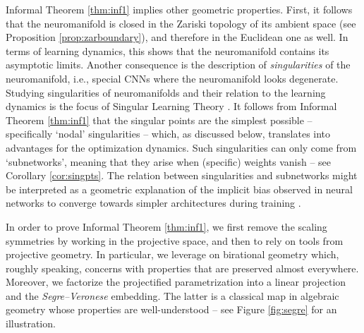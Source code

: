 \documentclass[twoside]{article}
\theoremstyle{plain}%
\theoremstyle{definition}
\theoremstyle{remark}
\begin{document}
Informal Theorem \ref{thm:inf1} implies other geometric properties. First, it follows that the neuromanifold is closed in the Zariski topology of its ambient space (see Proposition \ref{prop:zarboundary}), and therefore in the Euclidean one as well. In terms of learning dynamics, this shows that the neuromanifold contains its asymptotic limits. Another consequence is the description of \emph{singularities} of the neuromanifold, i.e., special CNNs where the neuromanifold looks degenerate. Studying singularities of neuromanifolds and their relation to the learning dynamics is the focus of Singular Learning Theory \parencite{watanabe2009algebraic,amari2006singularities}. It follows from Informal Theorem \ref{thm:inf1} that the singular points are the simplest possible -- specifically `nodal' singularities -- which, as discussed below, translates into advantages for the optimization dynamics. Such singularities can only come from `subnetworks', meaning that they arise when (specific) weights vanish -- see Corollary \ref{cor:singpts}. The relation between singularities and subnetworks might be interpreted as a geometric explanation of the implicit bias observed in neural networks to converge towards simpler architectures during training \parencite{frankle2018lottery}.

In order to prove Informal Theorem \ref{thm:inf1}, we first remove the scaling symmetries by working in the projective space, and then to rely on tools from projective geometry. In particular, we leverage on birational geometry which, roughly speaking, concerns with properties that are preserved almost everywhere. Moreover, we factorize the projectified parametrization into a linear projection and the \emph{Segre--Veronese} embedding. The latter is a classical map in algebraic geometry whose properties are well-understood -- see Figure \ref{fig:segre} for an illustration. 
\end{document}

